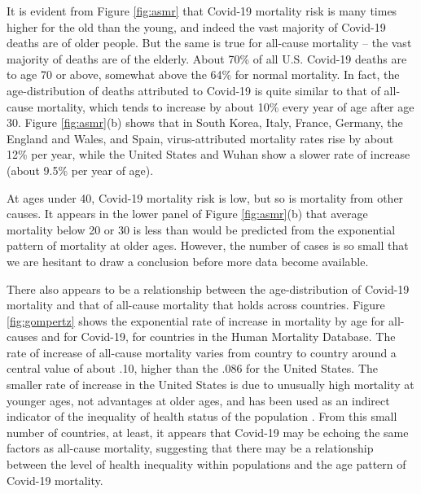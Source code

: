 \documentclass[9pt,twocolumn,twoside,lineno]{pnas-new}
\begin{document}
It is evident from Figure \ref{fig:asmr} that Covid-19 mortality risk
is many times higher for the old than the young, and indeed the vast
majority of Covid-19 deaths are of older people. But the same is true
for all-cause mortality -- the vast majority of deaths are of the
elderly. About 70\% of all U.S. Covid-19 deaths are to age 70 or
above, somewhat above the 64\% for normal mortality. In fact, the
age-distribution of deaths attributed to Covid-19 is quite similar to
that of all-cause mortality, which tends to increase by about 10\%
every year of age after age 30. Figure \ref{fig:asmr}(b) shows that in
South Korea, Italy, France, Germany, the England and Wales, and Spain,
virus-attributed mortality rates rise by about 12\% per year, while
the United States and Wuhan show a slower rate of increase (about
9.5\% per year of age).

At ages under 40, Covid-19 mortality risk is low, but so is mortality
from other causes. It appears in the lower panel of Figure
\ref{fig:asmr}(b) that average mortality below 20 or 30 is less than
would be predicted from the exponential pattern of mortality at older
ages. However, the number of cases is so small that we are hesitant to
draw a conclusion before more data become available.

There also appears to be a relationship between the age-distribution
of Covid-19 mortality and that of all-cause mortality that holds
across countries. Figure \ref{fig:gompertz} shows the exponential rate
of increase in mortality by age for all-causes and for Covid-19, for
countries in the Human Mortality Database. The rate of increase of
all-cause mortality varies from country to country around a central
value of about .10, higher than the .086 for the United States. The
smaller rate of increase in the United States is due to unusually high
mortality at younger ages, not advantages at older ages, and has been
used as an indirect indicator of the inequality of health status of
the population \cite{edwards:2005,aburto:2020}.  From this small
number of countries, at least, it appears that Covid-19 may be echoing
the same factors as all-cause mortality, suggesting that there may be
a relationship between the level of health inequality within
populations and the age pattern of Covid-19 mortality.
\end{document}
